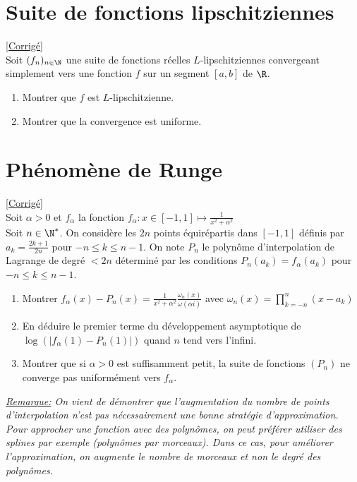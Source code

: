 \documentclass{book}
\begin{document}
	\section{Suite de fonctions lipschitziennes }
	\textcolor{blue}{\hyperref[Suite de fonctions lipschitziennes corrigé]{[Corrigé]}}\\
	\label{Suite de fonctions lipschitziennes}
	Soit $(f_n)_{n\in \N}$ une suite de fonctions réelles $L$-lipschitziennes convergeant simplement vers une fonction $f$ sur un segment $[a,b]$ de $\R$.
	\begin{enumerate}
		\item Montrer que $f$ est $L$-lipschitzienne.
		\item Montrer que la convergence est uniforme.
	\end{enumerate}
	
	\section{Phénomène de Runge}
	\textcolor{blue}{\hyperref[sec:phenomene-de-runge]{[Corrigé]}}\\
	\label{Phénomène de Runge}
	Soit $\alpha>0$ et $f_{\alpha}$ la fonction $f_{\alpha}:x\in[-1,1]\mapsto\displaystyle\frac{1}{x^2+\alpha^2}$
	\\Soit $n\in\N^*$. On considère les $2n$ points équirépartis dans $[-1,1]$ définis par $a_k=\displaystyle\frac{2k+1}{2n}$ pour $-n\leq k \leq n-1$. On note $P_n$ le polynôme d'interpolation de Lagrange de degré $<2n$ déterminé par les conditions $P_n(a_k)=f_\alpha(a_k)$ pour $-n\leq k \leq n-1$.
	\begin{enumerate}[leftmargin=*]
		\item Montrer $f_\alpha(x)-P_n(x)=\displaystyle\frac{1}{x^2+\alpha^2}\frac{\omega_n(x)}{\omega(\alpha i)}$ avec $\omega_n(x)=\displaystyle\prod\limits_{k=-n}^n(x-a_k)$
		\item En déduire le premier terme du développement asymptotique de $\log(|f_\alpha(1)-P_n(1)|)$ quand $n$ tend vers l'infini.
		\item Montrer que si $\alpha>0$ est suffisamment petit, la suite de fonctions $(P_n)$ ne converge pas uniformément vers $f_\alpha$.
	\end{enumerate}
	\textit{\underline{Remarque:} On vient de démontrer que l'augmentation du nombre de points d'interpolation n'est pas nécessairement une bonne stratégie d'approximation. Pour approcher une fonction avec des polynômes, on peut préférer utiliser des splines par exemple (polynômes par morceaux). Dans ce cas, pour améliorer l'approximation, on augmente le nombre de morceaux et non le degré des polynômes.}
	
\end{document}
